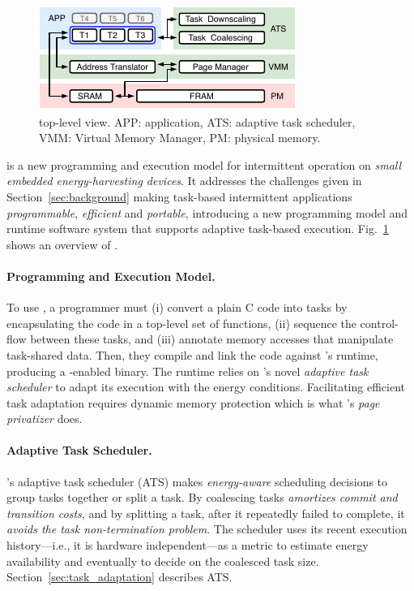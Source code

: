 \begin{figure}
	\centering
	\includegraphics[width=\columnwidth]{figures/system-overview.pdf}
	\caption{\sys top-level view. APP: application, ATS: adaptive task scheduler, VMM: Virtual Memory Manager, PM: physical memory.}
	\label{fig:system_overview}
\end{figure}

\sys is a new programming and execution model for intermittent operation on \emph{small embedded energy-harvesting devices}. It addresses the challenges given in Section~\ref{sec:background} making task-based intermittent applications {\em programmable}, {\em efficient} and {\em portable}, introducing a new programming model and runtime software system that supports adaptive task-based execution. Fig.~\ref{fig:system_overview} shows an overview of \sys.

\paragraph{Programming and Execution Model.}
To use \sys, a programmer must (i) convert a plain C code into tasks by encapsulating the code in a top-level set of functions, (ii) sequence the control-flow between these tasks, and (iii) annotate memory accesses that manipulate task-shared data. Then, they compile and link the code against \sys's runtime, producing a \sys-enabled binary. The runtime relies on \sys's novel {\em adaptive task scheduler} to adapt its execution with the energy conditions. Facilitating efficient task adaptation requires dynamic memory protection which is what \sys's \emph{page privatizer} does. 

\paragraph{Adaptive Task Scheduler.}
\sys's adaptive task scheduler (ATS) makes \emph{energy-aware} scheduling decisions to group tasks together or split a task. By coalescing tasks \sys \emph{amortizes commit and transition costs}, and by splitting a task, after it repeatedly failed to complete, it \emph{avoids the task non-termination problem}. The scheduler uses its recent execution history---i.e., it is hardware independent---as a metric to estimate energy availability and eventually to decide on the coalesced task size. Section~\ref{sec:task_adaptation} describes ATS.

